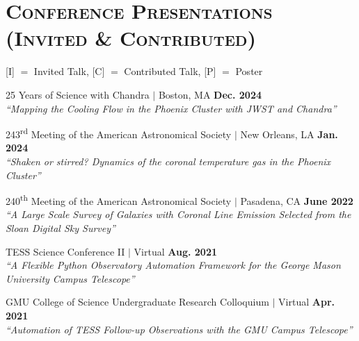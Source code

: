 \documentclass[marg, centered]{res}
\begin{document}
\begin{resume}
\begin{etaremune}[itemindent=0pt, leftmargin=19pt]
\end{etaremune}

\section{{\scshape \bfseries Conference Presentations \\(Invited \& Contributed)}}

{[I]} $=$ Invited Talk, {[C]} $=$ Contributed Talk, {[P]} $=$ Poster
\vspace{0.2cm}

\begin{etaremune}[itemindent=0pt, leftmargin=19pt]

\item 25 Years of Science with Chandra $|$ Boston, MA \hfill \textbf{Dec. 2024} \\
{}
\textit{``Mapping the Cooling Flow in the Phoenix Cluster with JWST and Chandra''} 

\item 243\textsuperscript{rd} Meeting of the American Astronomical Society $|$ New Orleans, LA \hfill \textbf{Jan. 2024} \\
{} 
\textit{``Shaken or stirred? Dynamics of the coronal temperature gas in the Phoenix Cluster''} 
    
\item 240\textsuperscript{th} Meeting of the American Astronomical Society $|$ Pasadena, CA \hfill \textbf{June 2022} \\
{} 
\textit{``A Large Scale Survey of Galaxies with Coronal Line Emission Selected from the Sloan Digital Sky Survey''}

\item TESS Science Conference II $|$ Virtual \hfill \textbf{Aug. 2021}\\
{} 
\textit{``A Flexible Python Observatory Automation Framework for the George Mason University Campus Telescope''}

\item GMU College of Science Undergraduate Research Colloquium $|$ Virtual \hfill \textbf{Apr. 2021}\\
{\sc [P]} \textit{``Automation of TESS Follow-up Observations with the GMU Campus Telescope''}


\end{etaremune}
\end{resume}
\end{document}
